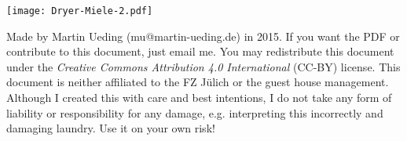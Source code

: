 \documentclass[11pt, english, fleqn, DIV=15, headinclude]{scrartcl}
\begin{document}
\texttt{[image: Dryer-Miele-2.pdf]}

\vfill

\begin{small}
    Made by Martin Ueding (mu@martin-ueding.de) in 2015. If you want the PDF or
    contribute to this document, just email me. You may redistribute this
    document under the \emph{Creative Commons Attribution 4.0 International}
    (CC-BY) license.
    This document is neither affiliated to the FZ Jülich or the guest house
    management.
    Although I created this with care and best intentions, I do not take any
    form of liability or responsibility for any damage, e.g. interpreting this
    incorrectly and damaging laundry. Use it on your own risk!
\end{small}
\end{document}
